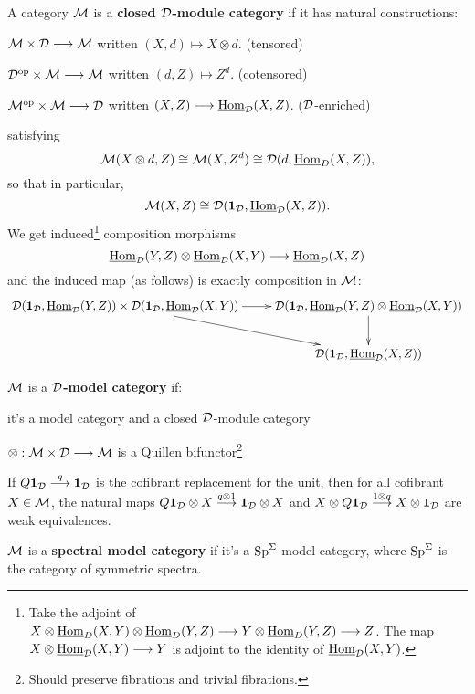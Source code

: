 \documentclass[11pt]{article}
\begin{document}
\begin{MichaelStableModelCats}
\begin{itemise}
\begin{itemise}
\end{itemise}
\item A category $\mathcal{M}$ is a \textbf{closed $\mathcal{D}$-module category} if it has natural constructions:
\begin{itemise}
\item $\mathcal{M}\times \mathcal{D}\longrightarrow\mathcal{M}$ written $(X,d)\mapsto X\otimes d$. {(tensored)}
\item $\mathcal{D}^{\textup{op}}\times\mathcal{M}\longrightarrow\mathcal{M}$ written $(d,Z)\mapsto Z^d$. {(cotensored)}
\item $\mathcal{M}^{\textup{op}}\times\mathcal{M}\longrightarrow\mathcal{D}$ written $(X,Z)\longmapsto \operatorname{\underline{Hom}}_{\mathcal{D}}(X,Z)$. {($\mathcal{D}$-enriched)}
\end{itemise}
satisfying
\[\mathcal{M}(X\otimes d,Z)\cong \mathcal{M}(X,Z^d)\cong\mathcal{D}(d,\operatorname{\underline{Hom}}_D(X,Z)),\]
so that in particular,
\[\mathcal{M}(X,Z)\cong \mathcal{D}(\textbf{1}_{\mathcal{D}},\operatorname{\underline{Hom}}_{\mathcal{D}}(X,Z)).\]
We get induced\footnote{Take the adjoint of 
$X\otimes \operatorname{\underline{Hom}}_D(X,Y)\otimes\operatorname{\underline{Hom}}_D(Y,Z)\longrightarrow Y\otimes\operatorname{\underline{Hom}}_D(Y,Z)\longrightarrow Z$. The map $X\otimes \operatorname{\underline{Hom}}_{\mathcal{D}}(X,Y)\longrightarrow Y$ is adjoint to the identity of $\operatorname{\underline{Hom}}_{\mathcal{D}}(X,Y)$.} composition morphisms
\[\operatorname{\underline{Hom}}_{\mathcal{D}}(Y,Z)\otimes\operatorname{\underline{Hom}}_{\mathcal{D}}(X,Y)\longrightarrow
\operatorname{\underline{Hom}}_{\mathcal{D}}(X,Z)\]
and the induced map (as follows) is exactly composition in $\mathcal{M}$:
\[\xymatrix{
\calD(\textbf{1}_\calD,\intHom_\calD(Y,Z))\times\calD(\textbf{1}_\calD,\intHom_\calD(X,Y))\ar[r]\ar[rd]&\ar[d]\calD(\textbf{1}_\calD,\intHom_\calD(Y,Z)\otimes\intHom_\calD(X,Y))\\&\calD(\textbf{1}_\calD,\intHom_\calD(X,Z))
}\]
\item $\mathcal{M}$ is a \textbf{$\mathcal{D}$-model category} if:
\begin{itemise}
\item it's a model category and a closed $\mathcal{D}$-module category
\item $\otimes:\mathcal{M}\times\mathcal{D}\longrightarrow\mathcal{M}$ is a Quillen bifunctor\footnote{Should preserve fibrations and trivial fibrations.}
\item If $Q\textbf{1}_{\mathcal{D}}\overset{q}{\longrightarrow}\textbf{1}_{\mathcal{D}}$ is the cofibrant replacement for the unit, then for all cofibrant $X\in\mathcal{M}$, the natural maps $Q\textbf{1}_{\mathcal{D}}\otimes X\overset{q\otimes1}{\longrightarrow}\textbf{1}_{\mathcal{D}}\otimes X$ and $X\otimes Q\textbf{1}_{\mathcal{D}} \overset{1\otimes q}{\longrightarrow}X\otimes \textbf{1}_{\mathcal{D}}$ are weak equivalences.
\end{itemise}
\item $\mathcal{M}$ is a \textbf{spectral model category} if it's a $\operatorname{Sp}^\Sigma$-model category, where $\operatorname{Sp}^\Sigma$ is the category of symmetric spectra.
\end{itemise}

\end{MichaelStableModelCats}
\end{document}
